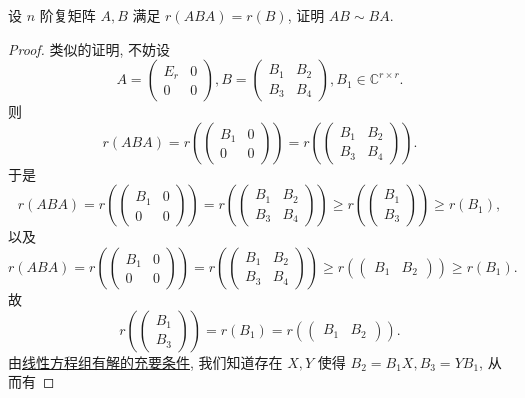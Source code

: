 \documentclass[../../main.tex]{subfiles}
\begin{document}
\begin{example}
设 \( n \) 阶复矩阵 \( A,B \) 满足 \( r(ABA) = r(B) \), 证明 \( AB \sim BA \).
\end{example}
\begin{proof}
类似的证明, 不妨设
\[
A = \begin{pmatrix} E_r & 0 \\ 0 & 0 \end{pmatrix}, B = \begin{pmatrix} B_1 & B_2 \\ B_3 & B_4 \end{pmatrix}, B_1 \in \mathbb{C}^{r \times r}.
\]
则
\[
r(ABA) = r\left( \begin{pmatrix} B_1 & 0 \\ 0 & 0 \end{pmatrix} \right) = r\left( \begin{pmatrix} B_1 & B_2 \\ B_3 & B_4 \end{pmatrix} \right).
\]
于是
\[
r(ABA) = r\left( \begin{pmatrix} B_1 & 0 \\ 0 & 0 \end{pmatrix} \right) = r\left( \begin{pmatrix} B_1 & B_2 \\ B_3 & B_4 \end{pmatrix} \right) \geqslant r\left( \begin{pmatrix} B_1 \\ B_3 \end{pmatrix} \right) \geqslant r(B_1),
\]
以及
\[
r(ABA) = r\left( \begin{pmatrix} B_1 & 0 \\ 0 & 0 \end{pmatrix} \right) = r\left( \begin{pmatrix} B_1 & B_2 \\ B_3 & B_4 \end{pmatrix} \right) \geqslant r\left( \begin{pmatrix} B_1 & B_2 \end{pmatrix} \right) \geqslant r(B_1).
\]
故
\[
r\left( \begin{pmatrix} B_1 \\ B_3 \end{pmatrix} \right) = r(B_1) = r\left( \begin{pmatrix} B_1 & B_2 \end{pmatrix} \right).
\]
由\hyperref[theorem:线性方程组有解的充要条件]{线性方程组有解的充要条件}, 我们知道存在 \( X,Y \) 使得 \( B_2 = B_1X, B_3 = YB_1 \), 从而有

\end{proof}
\end{document}
